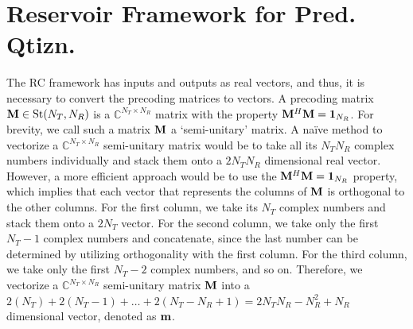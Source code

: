 \documentclass[conference]{IEEEtran}
\begin{document}
{\section{Reservoir Framework for Pred. Qtizn.}
\label{section3}
The RC framework has inputs and outputs as real vectors, and thus, it is necessary to convert the precoding matrices to vectors.
A precoding matrix $\mathcal{{\bf M}} \in \text{St}(N_T,N_R)$ is a $\mathbb{C}^{N_T \times N_R}$ matrix with the property $\mathcal{{\bf M}}^H\mathcal{{\bf M}}=\text{\textbf{1}}_{N_R}$.
For brevity, we call such a matrix $\mathcal{{\bf M}}$ a `semi-unitary' matrix.
A na{\"i}ve method to vectorize a $\mathbb{C}^{N_T \times N_R}$ semi-unitary matrix would be to take all its $N_TN_R$ complex numbers individually and stack them onto a $2N_TN_R$ dimensional real vector.
However, a more efficient approach would be to use the $\mathcal{{\bf M}}^H\mathcal{{\bf M}}=\text{\textbf{1}}_{N_R}$ property, which implies that each vector that represents the columns of $\mathcal{{\bf M}}$ is orthogonal to the other columns.
For the first column, we take its $N_T$ complex numbers and stack them onto a $2N_T$ vector.
For the second column, we take only the first $N_T-1$ complex numbers and concatenate, since the last number can be determined by utilizing orthogonality with the first column.
For the third column, we take only the first $N_T-2$ complex numbers, and so on.
Therefore, we vectorize a $\mathbb{C}^{N_T \times N_R}$ semi-unitary matrix $\mathcal{{\bf M}}$ into a $2(N_T)+2(N_T-1)+\ldots+2(N_T-N_R+1)= 2N_TN_R-N_R^2+N_R$ dimensional vector, denoted as ${\bf m}$.


}
\end{document}
